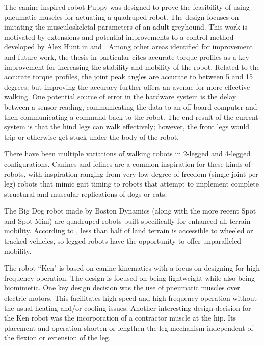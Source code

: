 
The canine-inspired robot Puppy was designed to prove the feasibility of using
pneumatic muscles for actuating a quadruped robot. The design focuses on 
imitating the musculoskeletal parameters of an adult greyhound. 
\cite{PuppyDesign} This work is motivated by extensions and potential
improvements to a control method developed by Alex Hunt in
\cite{HuntPhDThesis} and \cite{HuntHindLegWalking}. Among other areas identified
for improvement and future work, the thesis in particular cites accurate torque
profiles as a key improvement for increasing the stability and mobility of the
robot. Related to the accurate torque profiles, the joint peak angles are
accurate to between 5 and 15 degrees, but improving the accuracy further offers
an avenue for more effective walking. One potential source of error in the
hardware system is the delay between a sensor reading, communicating the data to
an off-board computer and then communicating a command back to the robot. The end
result of the current system is that the hind legs can walk effectively;
however, the front legs would trip or otherwise get stuck under the body of the
robot.


There have been multiple variations of walking robots in 2-legged and 4-legged
configurations. Canines and felines are a common inspiration for these kinds of
robots, with inspiration ranging from very low degree of freedom (single joint
per leg) robots that mimic gait timing to robots that attempt to implement
complete structural and muscular replications of dogs or cats.


The Big Dog robot made by Boston Dynamics (along with the more recent Spot and
Spot Mini) are quadruped robots built specifically for enhanced all terrain
mobility. According to \cite{BigDog}, less than half of land terrain is
accessible to wheeled or tracked vehicles, so legged robots have the opportunity
to offer unparalleled mobility.

The robot ``Ken" is based on canine kinematics with a focus on designing for
high frequency operation. The design is focused on being lightweight while also
being biomimetic. One key design decision was the use of pneumatic muscles over
electric motors. This facilitates high speed and high frequency operation
without the usual heating and/or cooling issues. Another interesting design
decision for the Ken robot was the incorporation of a contractor muscle at the
hip. Its placement and operation shorten or lengthen the leg mechanism
independent of the flexion or extension of the leg.
\cite{Narioka2012}

